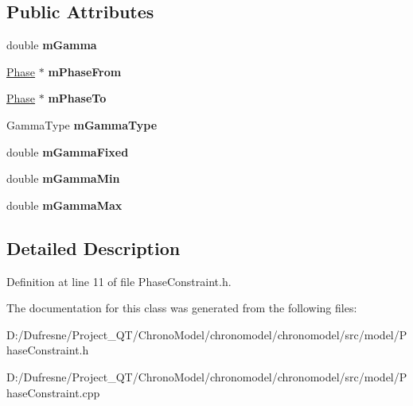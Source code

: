 \subsection*{Public Attributes}
\begin{DoxyCompactItemize}
\item 
\hypertarget{class_phase_constraint_affb8de4c6afb5bbf1874d1ce684ab3cf}{double {\bfseries m\-Gamma}}\label{class_phase_constraint_affb8de4c6afb5bbf1874d1ce684ab3cf}

\item 
\hypertarget{class_phase_constraint_aeef9a758741ce23cb83e33f870323fe6}{\hyperlink{class_phase}{Phase} $\ast$ {\bfseries m\-Phase\-From}}\label{class_phase_constraint_aeef9a758741ce23cb83e33f870323fe6}

\item 
\hypertarget{class_phase_constraint_a4acd63506eca431b65aa6dc6912e01c7}{\hyperlink{class_phase}{Phase} $\ast$ {\bfseries m\-Phase\-To}}\label{class_phase_constraint_a4acd63506eca431b65aa6dc6912e01c7}

\item 
\hypertarget{class_phase_constraint_a3eeed86a3f9b1e50e962d5306ec7aadf}{Gamma\-Type {\bfseries m\-Gamma\-Type}}\label{class_phase_constraint_a3eeed86a3f9b1e50e962d5306ec7aadf}

\item 
\hypertarget{class_phase_constraint_a4b358ceb67b7df8978d184ef2282875b}{double {\bfseries m\-Gamma\-Fixed}}\label{class_phase_constraint_a4b358ceb67b7df8978d184ef2282875b}

\item 
\hypertarget{class_phase_constraint_a98a2881ffed0d6da42c85da277b379ba}{double {\bfseries m\-Gamma\-Min}}\label{class_phase_constraint_a98a2881ffed0d6da42c85da277b379ba}

\item 
\hypertarget{class_phase_constraint_a8de78b9f0d11d2015540a1de08db312f}{double {\bfseries m\-Gamma\-Max}}\label{class_phase_constraint_a8de78b9f0d11d2015540a1de08db312f}

\end{DoxyCompactItemize}


\subsection{Detailed Description}


Definition at line 11 of file Phase\-Constraint.\-h.



The documentation for this class was generated from the following files\-:\begin{DoxyCompactItemize}
\item 
D\-:/\-Dufresne/\-Project\-\_\-\-Q\-T/\-Chrono\-Model/chronomodel/chronomodel/src/model/Phase\-Constraint.\-h\item 
D\-:/\-Dufresne/\-Project\-\_\-\-Q\-T/\-Chrono\-Model/chronomodel/chronomodel/src/model/Phase\-Constraint.\-cpp\end{DoxyCompactItemize}
